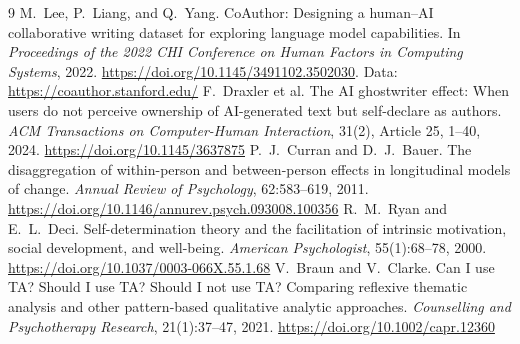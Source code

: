 \documentclass[10pt]{article}
\begin{document}
\small
\begin{thebibliography}{9}
 M.~Lee, P.~Liang, and Q.~Yang. CoAuthor: Designing a human--AI collaborative writing dataset for exploring language model capabilities. In \emph{Proceedings of the 2022 CHI Conference on Human Factors in Computing Systems}, 2022. \url{https://doi.org/10.1145/3491102.3502030}. Data: \url{https://coauthor.stanford.edu/}
 F.~Draxler et al. The AI ghostwriter effect: When users do not perceive ownership of AI-generated text but self-declare as authors. \emph{ACM Transactions on Computer-Human Interaction}, 31(2), Article 25, 1--40, 2024. \url{https://doi.org/10.1145/3637875}
 P.~J.~Curran and D.~J.~Bauer. The disaggregation of within-person and between-person effects in longitudinal models of change. \emph{Annual Review of Psychology}, 62:583--619, 2011. \url{https://doi.org/10.1146/annurev.psych.093008.100356}
 R.~M.~Ryan and E.~L.~Deci. Self-determination theory and the facilitation of intrinsic motivation, social development, and well-being. \emph{American Psychologist}, 55(1):68--78, 2000. \url{https://doi.org/10.1037/0003-066X.55.1.68}
 V.~Braun and V.~Clarke. Can I use TA? Should I use TA? Should I not use TA? Comparing reflexive thematic analysis and other pattern-based qualitative analytic approaches. \emph{Counselling and Psychotherapy Research}, 21(1):37--47, 2021. \url{https://doi.org/10.1002/capr.12360}
\end{thebibliography}
\end{document}
